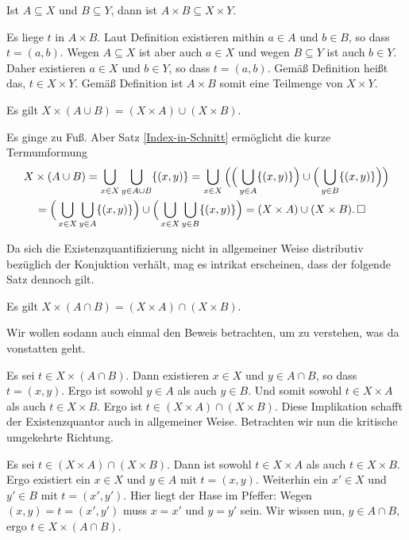 \begin{Satz}
Ist $A\subseteq X$ und $B\subseteq Y$, dann ist
$A\times B\subseteq X\times Y$.
\end{Satz}
\begin{Beweis}
Es liege $t$ in $A\times B$. Laut Definition existieren mithin
$a\in A$ und $b\in B$, so dass $t=(a,b)$. Wegen $A\subseteq X$ ist aber
auch $a\in X$ und wegen $B\subseteq Y$ ist auch $b\in Y$. Daher existieren
$a\in X$ und $b\in Y$, so dass $t=(a,b)$. Gemäß Definition heißt das,
$t\in X\times Y$. Gemäß Definition ist $A\times B$ somit eine Teilmenge
von $X\times Y$.\;\qedsymbol
\end{Beweis}

\begin{Satz}
Es gilt $X\times (A\cup B) = (X\times A)\cup (X\times B)$.
\end{Satz}
\begin{Beweis}
Es ginge zu Fuß. Aber Satz \ref{Index-in-Schnitt} ermöglicht die
kurze Termumformung%
\begin{align*}
& X\times (A\cup B) = \bigcup_{x\in X}\bigcup_{y\in A\cup B} \{(x,y)\}
= \bigcup_{x\in X}\Big(\Big(\bigcup_{y\in A}\{(x,y)\}\Big)\cup \Big(\bigcup_{y\in B}\{(x,y)\}\Big)\Big)\\
&\quad = \Big(\bigcup_{x\in X}\bigcup_{y\in A}\{(x,y)\}\Big)\cup\Big(\bigcup_{x\in X}\bigcup_{y\in B}\{(x,y)\}\Big)
= (X\times A)\cup (X\times B).\,\Box
\end{align*}
\end{Beweis}

\noindent
Da sich die Existenzquantifizierung nicht in allgemeiner Weise
distributiv bezüglich der Konjuktion verhält, mag es intrikat erscheinen,
dass der folgende Satz dennoch gilt.
\begin{Satz}
Es gilt $X\times (A\cap B) = (X\times A)\cap (X\times B)$.
\end{Satz}
\begin{Beweis}
Wir wollen sodann auch einmal den Beweis betrachten, um zu verstehen,
was da vonstatten geht.

Es sei $t\in X\times (A\cap B)$. Dann existieren $x\in X$ und
$y\in A\cap B$, so dass $t=(x,y)$. Ergo ist sowohl $y\in A$ als
auch $y\in B$. Und somit sowohl $t\in X\times A$ als auch
$t\in X\times B$. Ergo ist $t\in (X\times A)\cap (X\times B)$.
Diese Implikation schafft der Existenzquantor auch in allgemeiner
Weise. Betrachten wir nun die kritische umgekehrte Richtung.

Es sei $t\in (X\times A)\cap (X\times B)$. Dann ist sowohl
$t\in X\times A$ als auch $t\in X\times B$. Ergo existiert ein
$x\in X$ und $y\in A$ mit $t=(x,y)$. Weiterhin ein $x'\in X$ und
$y'\in B$ mit $t=(x',y')$. Hier liegt der Hase im Pfeffer: Wegen
$(x,y)=t=(x',y')$ muss $x=x'$ und $y=y'$ sein. Wir wissen nun,
$y\in A\cap B$, ergo $t\in X\times (A\cap B)$.\,\qedsymbol
\end{Beweis}

